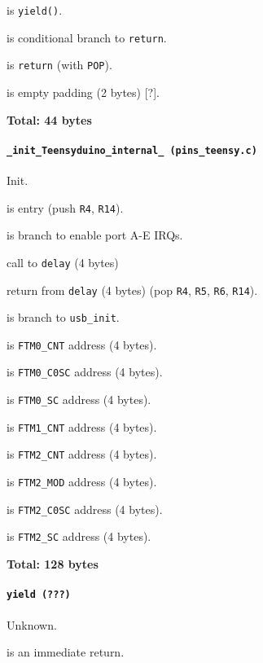  is \texttt{yield()}.

 is conditional branch to \texttt{return}.

 is \texttt{return} (with \texttt{POP}).

 is empty padding (2 bytes) [?].

\textbf{Total: 44 bytes}

\paragraph{\texttt{\_init\_Teensyduino\_internal\_ (pins\_teensy.c)}}
Init.

 is entry (push \texttt{R4}, \texttt{R14}).

 is branch to enable port A-E IRQs.

 call to \texttt{delay} (4 bytes)

 return from \texttt{delay} (4 bytes) (pop \texttt{R4},
\texttt{R5}, \texttt{R6}, \texttt{R14}).

 is branch to \texttt{usb\_init}.

\vspace{1em}

 is \texttt{FTM0\_CNT} address (4 bytes).

 is \texttt{FTM0\_C0SC} address (4 bytes).

 is \texttt{FTM0\_SC} address (4 bytes).

 is \texttt{FTM1\_CNT} address (4 bytes).

 is \texttt{FTM2\_CNT} address (4 bytes).

 is \texttt{FTM2\_MOD} address (4 bytes).

 is \texttt{FTM2\_C0SC} address (4 bytes).

 is \texttt{FTM2\_SC} address (4 bytes).

\textbf{Total: 128 bytes}

\paragraph{\texttt{yield (???)}} Unknown.

 is an immediate return.

